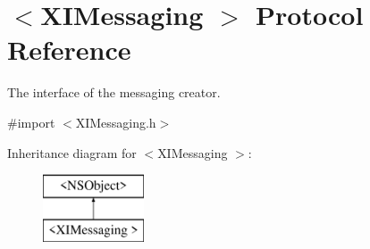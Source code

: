 \hypertarget{protocol_x_i_messaging_01-p}{}\section{$<$X\+I\+Messaging $>$ Protocol Reference}
\label{protocol_x_i_messaging_01-p}


The interface of the messaging creator.  




{\ttfamily \#import $<$X\+I\+Messaging.\+h$>$}

Inheritance diagram for $<$X\+I\+Messaging $>$\+:\begin{figure}[H]
\begin{center}
\leavevmode
\includegraphics[height=2.000000cm]{protocol_x_i_messaging_01-p}
\end{center}
\end{figure}
